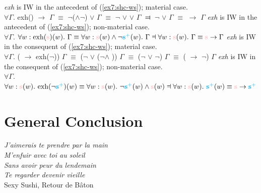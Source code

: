 \begin{exe}
	\ex\label{ex7:hc-s-ws-iw}
	\begin{xlist}
		\ex\textit{exh} is IW in the antecedent of (\ref{ex7:shc-ws}); material case.\\ $\forall \Gamma.$ exh(\s) $\rightarrow$ $\Gamma$ $\equiv$ $\neg$(\s$\wedge$$\neg$\splus) $\vee$ $\Gamma$ $\equiv$ $\neg$\s{} $\vee$ \splus{} $\vee$ $\Gamma$ $\Dashv$ $\neg$\s{} $\vee$ $\Gamma$ $\equiv$ \s{} $\rightarrow$ $\Gamma$
		\ex\textit{exh} is IW in the antecedent of (\ref{ex7:shc-ws}); non-material case.\\ $\forall \Gamma.$ $\forall w: \text{exh}(\s)(w). \ \Gamma \equiv \forall w: \s(w) \wedge \neg\splus(w). \ \Gamma \Dashv \forall w: \s(w). \ \Gamma \equiv \s{} \rightarrow \Gamma$
		\ex\textit{exh} is IW in the consequent of (\ref{ex7:shc-ws}); material case.\\
		$\forall \Gamma.$ (\s{} $\rightarrow$ exh($\neg$\splus)) $\Gamma$ $\equiv$ ($\neg$\s{} $\vee$ ($\neg$\splus $\wedge$ \s)) $\Gamma$ $\equiv$ ($\neg$\s{} $\vee$ $\neg$\splus) $\Gamma$ $\equiv$ (\s{} $\rightarrow$ $\neg$\splus) $\Gamma$
		\ex\textit{exh} is IW in the consequent of (\ref{ex7:shc-ws}); non-material case.\\$\forall \Gamma.$ $\forall w: \s(w). \ \text{exh}(\neg\splus)(w) \equiv \forall w: \s(w). \ \neg\splus(w) \wedge \s(w) \Dashv \forall w: \s(w). \ \splus(w) \equiv \s{} \rightarrow \splus$
	\end{xlist}
\end{exe}



\newpage



\chapter*{General Conclusion}

\begin{flushright}
	\textit{J'aimerais te prendre par la main}\\
	\textit{M'enfuir avec toi au soleil}\\
	\textit{Sans avoir peur du lendemain}\\
	\textit{Te regarder devenir vieille}\\\vspace{2mm}
	Sexy Sushi, Retour de Bâton
\end{flushright}

